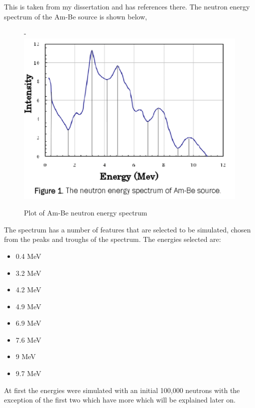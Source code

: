 \documentclass[a4paper]{article}
\begin{document}
\noindent This is taken from my dissertation and has references there.
\newline The neutron energy spectrum of the Am-Be source is shown below,
\begin{figure}[H]-
        \centering
        \includegraphics[width=1\linewidth]{Fast/spectrum.PNG}
        \caption{Plot of Am-Be neutron energy spectrum}
        \label{fig:south2d}
        \end{figure}
\noindent The spectrum has a number of features that are selected to be simulated, chosen from the  peaks and troughs of the spectrum. The energies selected are:
\begin{itemize}
    \item 0.4 MeV
    \item 3.2 MeV
    \item 4.2 MeV
    \item 4.9 MeV
    \item 6.9 MeV
    \item 7.6 MeV
    \item 9 MeV
    \item 9.7 MeV
\end{itemize}
\noindent At first the energies were simulated with an initial 100,000 neutrons with the exception of the first two which have more which will be explained later on. 
\end{document}
